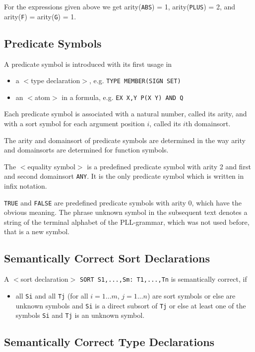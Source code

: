 \Ex

For the expressions given above we get arity({\tt ABS}) = 1,
arity({\tt PLUS}) = 2, and arity({\tt F}) = arity({\tt G}) = 1. 


\subsection{Predicate Symbols} 
\label{PredicateSymbols}
A predicate symbol is introduced with its first usage in 
\begin{itemize}
\item a $<$type declaration$>$, e.g. {\tt TYPE MEMBER(SIGN SET)} 
\item an $<$atom$>$ in a formula, e.g. {\tt EX X,Y P(X Y) AND Q} 
\end{itemize}

Each predicate symbol is associated with a natural number, called its 
arity, and with a sort symbol for each argument position $i$, called its $i$th 
domainsort. 

The arity and domainsort of predicate symbols are determined in the way 
arity and domainsorts are determined for function symbols.

The $<$equality symbol$>$ is a predefined predicate symbol with arity 2 and 
first and second domainsort {\tt ANY}. It is the only predicate symbol which is 
written in infix notation. 

{\tt TRUE} and {\tt FALSE} are predefined predicate symbols with arity
0, which have the obvious meaning.  The phrase unknown symbol in the
subsequent text denotes a string of the terminal alphabet of the
PLL-grammar, which was not used before, that is a new symbol.

\subsection{Semantically Correct Sort Declarations}
\label{SemanticallycorrectSortDeclarations} 

A $<$sort declaration$>$ {\tt SORT S1,...,Sm: T1,...,Tn} is
semantically correct, if 
\begin{itemize}
\item all {\tt Si} and all {\tt Tj} (for all $i=1\ldots m$, $j=1\ldots n$) 
are sort symbols or else are unknown 
symbols and {\tt Si} is a direct subsort of {\tt Tj} or else at least 
one of the symbols {\tt Si} and {\tt Tj} is an unknown symbol.
\end{itemize}


\subsection{Semantically Correct Type Declarations}
\label{SemanticallyCorrectTypeDeclarations} 

